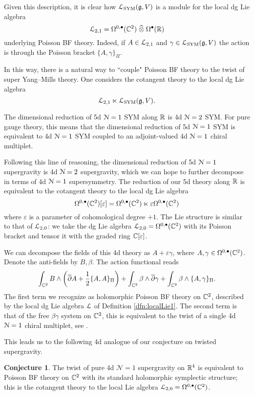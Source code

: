 \documentclass[11pt, oneside, reqno]{amsart}
\theoremstyle{definition} \newtheorem{definition}{Definition}[section]
\newtheorem{conjecture}[definition]{Conjecture}
\theoremstyle{definition}
\theoremstyle{remark}
\theoremstyle{definition} \newtheorem{remark}[definition]{Remark}
\theoremstyle{definition} \newtheorem{remarks}[definition]{Remarks}
\theoremstyle{definition} \newtheorem{question}[definition]{Question}
\theoremstyle{definition} \newtheorem*{note}{Note}
\theoremstyle{definition} \newtheorem{example}[definition]{Example}
\theoremstyle{definition} \newtheorem{examples}[definition]{Examples}
\def\bu{\bullet}
\def\Hat{\widehat}
\newcommand{\dbar}{\overline{\partial}}
\newcommand{\mc}[1]{\mathcal{#1}}
\def\ep{{\varepsilon}}
\begin{document}
Given this description, it is clear how $\mathcal L_{\rm SYM}(\mathfrak g, V)$ is a module for the local dg Lie algebra 
\[
\cL_{2,1} = \Omega^{0,\bu}(\CC^2) \; \Hat{\otimes} \; \Omega^\bu(\RR)
\]
underlying Poisson BF theory. 
Indeed, if $A \in \mathcal L_{2,1}$ and $\gamma \in \mathcal L_{\rm SYM}(\mathfrak g, V)$ the action is through the Poisson bracket $\{A, \gamma\}_\Pi$.

In this way, there is a natural way to ``couple" Poisson BF theory to the twist of super Yang--Mills theory.
One considers the cotangent theory to the local dg Lie algebra
\[
\mathcal L_{2,1} \ltimes \mathcal L_{\rm SYM}(\mathfrak g, V) .
\]

The dimensional reduction of 5d $\mathcal N=1$ SYM along $\mathbb R$ is 4d $\mathcal N=2$ SYM. 
For pure gauge theory, this means that the dimensional reduction of 5d $\mathcal N=1$ SYM is equivalent to 4d $\mathcal N=1$ SYM coupled to an adjoint-valued 4d $\mathcal N=1$ chiral multiplet. 

Following this line of reasoning, the dimensional reduction of 5d $\mathcal N=1$ supergravity is 4d $\mathcal N=2$ supergravity, which we can hope to further decompose in terms of 4d $\mathcal N=1$ supersymmetry. 
The reduction of our 5d theory along $\mathbb R$ is equivalent to the cotangent theory to the local dg Lie algebra 
\[
\Omega^{0,\bu}(\CC^2)[\ep] = \Omega^{0,\bu}(\CC^2) \ltimes \ep \Omega^{0,\bu}(\CC^2) 
\]
where $\ep$ is a parameter of cohomological degree $+1$. 
The Lie structure is similar to that of $\mathcal L_{2,0}$: we take the dg Lie algebra $\cL_{2,0} = \Omega^{0,\bu}(\CC^2)$ with its Poisson bracket and tensor it with the graded ring $\CC[\ep]$. 

We can decompose the fields of this 4d theory as $A + \ep \gamma$, where $A, \gamma \in \Omega^{0,\bu}(\CC^2)$. 
Denote the anti-fields by $B, \beta$.
The action functional reads
\[
\int_{\CC^2} B\wedge \left(\dbar A + \frac{1}{2} \{A,A\}_\Pi \right) + \int_{\CC^2} \beta \wedge \dbar \gamma + \int_{\CC^2} \beta \wedge \{A, \gamma\}_\Pi .
\]
The first term we recognize as holomorphic Poisson BF theory on $\mathbb C^2$, described by the local dg Lie algebra $\mathcal L$ of Definition \ref{dfn:localLie1}.
The second term is that of the free $\beta\gamma$ system on $\mathbb C^2$, this is equivalent to the twist of a single 4d $\mathcal N=1$ chiral multiplet, see \cite{ESW}. 

This leads us to the following 4d analogue of our conjecture on twisted supergravity.

\begin{conjecture}
The twist of pure 4d $\mc N = 1$ supergravity on $\mathbb R^4$ is equivalent to Poisson BF theory on $\mathbb C^2$ with its standard holomorphic symplectic structure; this is the cotangent theory to the local Lie algebra $\cL_{2,0} = \Omega^{0,\bu}(\CC^2)$. 
\end{conjecture}
 
\end{document}
